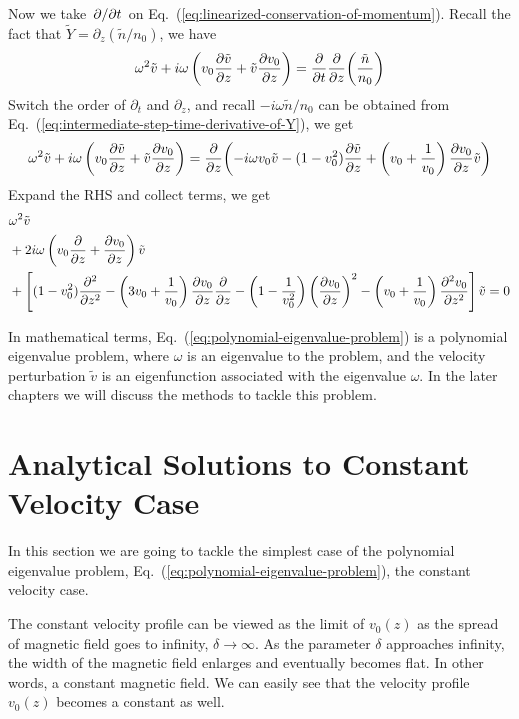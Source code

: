 Now we take $\pdv*{t}$ on Eq.~(\ref{eq:linearized-conservation-of-momentum}). Recall the fact that $\tilde{Y} = \partial_z(\tilde{n}/n_0)$, we have
\[
	\omega^2\tilde{v} + i\omega\left(v_0\pdv{\tilde{v}}{z} + \tilde{v}\pdv{v_0}{z}\right)
	= \pdv{t}\pdv{z}(\frac{\tilde{n}}{n_0})
\]
Switch the order of $\partial_t$ and $\partial_z$, and recall $-i\omega \tilde{n}/n_0$ can be obtained from Eq.~(\ref{eq:intermediate-step-time-derivative-of-Y}), we get
\[
	\omega^2\tilde{v} + i\omega\left(v_0\pdv{\tilde{v}}{z} + \tilde{v}\pdv{v_0}{z}\right)
	= \pdv{z}(-i\omega v_0\tilde{v}
	- (1-v_0^2)\pdv{\tilde{v}}{z}
	+ \left(v_0+\frac{1}{v_0}\right)\pdv{v_0}{z}\tilde{v})
\]
Expand the RHS and collect terms, we get
\begin{equation} \label{eq:polynomial-eigenvalue-problem}
	\begin{aligned}
		 & \omega^2 \tilde{v}                                          \\
		 & +2i\omega\left(v_0\pdv{}{z} + \pdv{v_0}{z}\right) \tilde{v} \\
		 & +\left[ (1-v_0^2)\pdv[2]{}{z}
			-\left(3v_0 + \frac{1}{v_0}\right)\pdv{v_0}{z}\pdv{}{z}
			- \left(1-\frac{1}{v_0^2}\right)\left(\pdv{v_0}{z}\right)^2
			- \left(v_0+\frac{1}{v_0}\right)\pdv[2]{v_0}{z} \right]\tilde{v}
		= 0
	\end{aligned}
\end{equation}

In mathematical terms, Eq.~(\ref{eq:polynomial-eigenvalue-problem}) is a polynomial eigenvalue problem, where $\omega$ is an eigenvalue to the problem, and the velocity perturbation $\tilde{v}$ is an eigenfunction associated with the eigenvalue $\omega$. In the later chapters we will discuss the methods to tackle this problem.

\section{Analytical Solutions to Constant Velocity Case} \label{sec:analytical-solutions}
In this section we are going to tackle the simplest case of the polynomial eigenvalue problem, Eq.~(\ref{eq:polynomial-eigenvalue-problem}), the constant velocity case.

The constant velocity profile can be viewed as the limit of $v_0(z)$ as the spread of magnetic field goes to infinity, $\delta\to\infty$. As the parameter $\delta$ approaches infinity, the width of the magnetic field enlarges and eventually becomes flat. In other words, a constant magnetic field. We can easily see that the velocity profile $v_0(z)$ becomes a constant as well.

